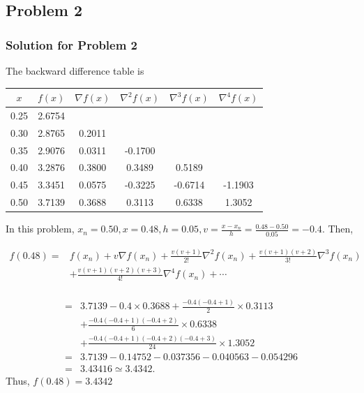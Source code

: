 \documentclass{beamer}
\begin{document}
\subsection{Problem 2}
\begin{frame}
\frametitle{Solution for Problem 2}
 The backward difference table is

\begin{center}
\begin{tabular}{|c|c|c|c|c|c|}
\hline
$x$ & $f(x)$ & $\nabla f(x)$ & $\nabla^{2} f(x)$ & $\nabla^{3} f(x)$ & $\nabla^{4} f(x)$ \\
\hline
0.25 & 2.6754 &  &  &  &  \\
\hline
0.30 & 2.8765 & 0.2011 &  &  &  \\
\hline
0.35 & 2.9076 & 0.0311 & -0.1700 &  &  \\
\hline
0.40 & 3.2876 & 0.3800 & 0.3489 & 0.5189 &  \\
\hline
0.45 & 3.3451 & 0.0575 & -0.3225 & -0.6714 & -1.1903 \\
\hline
0.50 & 3.7139 & 0.3688 & 0.3113 & 0.6338 & 1.3052 \\
\hline
\end{tabular}
\end{center}

In this problem, $x_{n}=0.50, x=0.48, h=0.05, v=\frac{x-x_{n}}{h}=\frac{0.48-0.50}{0.05}=-0.4$. Then,

$$
\begin{aligned}
f(0.48)= & f\left(x_{n}\right)+v \nabla f\left(x_{n}\right)+\frac{v(v+1)}{2 !} \nabla^{2} f\left(x_{n}\right)+\frac{v(v+1)(v+2)}{3 !} \nabla^{3} f\left(x_{n}\right) \\
& +\frac{v(v+1)(v+2)(v+3)}{4 !} \nabla^{4} f\left(x_{n}\right)+\cdots \\
\end{aligned}
$$
\end{frame}

\begin{frame}
$$
\begin{aligned}
= & 3.7139-0.4 \times 0.3688+\frac{-0.4(-0.4+1)}{2} \times 0.3113 \\
& +\frac{-0.4(-0.4+1)(-0.4+2)}{6} \times 0.6338 \\
& +\frac{-0.4(-0.4+1)(-0.4+2)(-0.4+3)}{24} \times 1.3052 \\
= & 3.7139-0.14752-0.037356-0.040563-0.054296 \\
= & 3.43416 \simeq 3.4342 .
\end{aligned}
$$
Thus, $f(0.48)=3.4342$
\end{frame}
\end{document}

